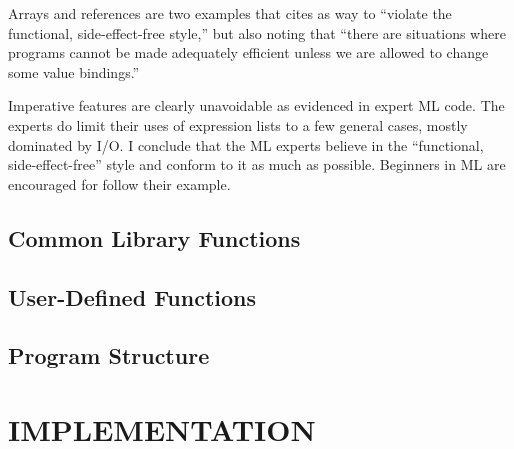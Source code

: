 \documentclass[12pt,abstracton]{scrartcl}
\begin{document}
Arrays and references are two examples that \cite{Ull98} cites as way to ``violate the functional,
side-effect-free style,'' but also noting that ``there are situations where programs cannot
be made adequately efficient unless we are allowed to change some value bindings.''

Imperative features are clearly unavoidable as evidenced in expert ML code. The experts do
limit their uses of expression lists to a few general cases, mostly dominated by I/O.
I conclude that the ML experts believe in the ``functional, side-effect-free'' style
and conform to it as much as possible. Beginners in ML are encouraged for follow their example.
\subsection{Common Library Functions}\label{subsec:imp}
\subsection{User-Defined Functions}\label{subsec:userfun}
\subsection{Program Structure}\label{subsec:struct}
\section{IMPLEMENTATION}\label{sec:impl}
\end{document}
